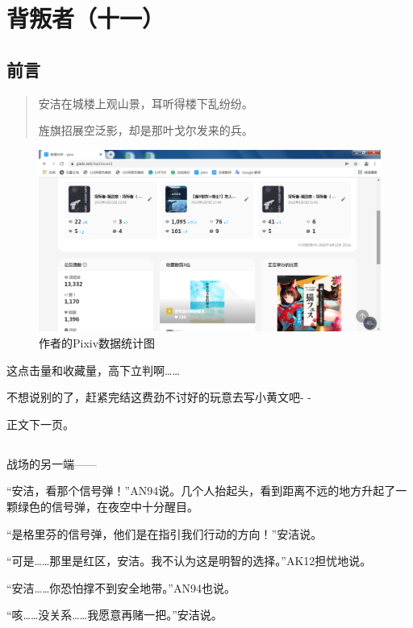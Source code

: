 \chapter{背叛者（十一）}

\section*{前言}
\begin{verse}
安洁在城楼上观山景，耳听得楼下乱纷纷。

旌旗招展空泛影，却是那叶戈尔发来的兵。
\end{verse}

\lineseparator{}


\begin{figure}[htbp]
  \centering
  \includegraphics[width=0.7\linewidth]{tei570040063950_ed20dd5e01572ca6287298ecdffa8895.png}
  \caption{作者的Pixiv数据统计图}
  \label{fig:作者的Pixiv数据统计图}
\end{figure}

这点击量和收藏量，高下立判啊……

不想说别的了，赶紧完结这费劲不讨好的玩意去写小黄文吧- -

正文下一页。

\section*{}



战场的另一端——

“安洁，看那个信号弹！”AN94说。几个人抬起头，看到距离不远的地方升起了一颗绿色的信号弹，在夜空中十分醒目。

“是格里芬的信号弹，他们是在指引我们行动的方向！”安洁说。

“可是……那里是红区，安洁。我不认为这是明智的选择。”AK12担忧地说。

“安洁……你恐怕撑不到安全地带。”AN94也说。

“咳……没关系……我愿意再赌一把。”安洁说。

